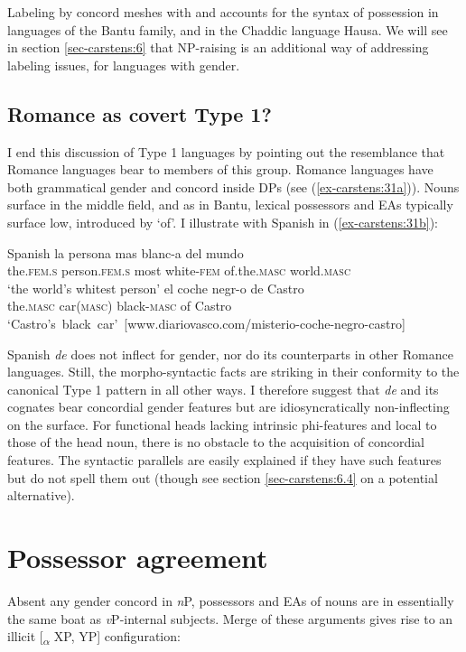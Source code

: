 \documentclass[output=paper
,modfonts
,nonflat]{langsci/langscibook}
\begin{document}
Labeling by concord meshes with and accounts for the syntax of possession in languages of the Bantu family, and in the Chaddic language Hausa. We will see in section \ref{sec-carstens:6} that NP-raising is an additional way of addressing labeling issues, for languages with gender. 

\subsection{Romance as covert Type 1?} \label{sec-carstens:3.3}

I end this discussion of Type 1 languages by pointing out the resemblance that Romance languages bear to members of this group. Romance languages have both grammatical gender and concord inside DPs (see (\ref{ex-carstens:31a})). Nouns surface in the middle field, and as in Bantu, lexical possessors and EAs typically surface low, introduced by ‘of’. I illustrate with Spanish in (\ref{ex-carstens:31b}):

\begin{exe}
	\ex Spanish \label{ex-carstens:31}
	\xlist
	\ex \label{ex-carstens:31a}
	\gll la           persona       mas   blanc-a      del mundo \\
	the.\textsc{fem}.\textsc{s}   person.\textsc{fem}.\textsc{s}   most white-\textsc{fem}     of.the.\textsc{masc} world.\textsc{masc}\\
	\glt `the world's whitest person'  	
	\ex \label{ex-carstens:31b}
	\gll el       coche       negr-o      de Castro \\
	the.\textsc{masc} car(\textsc{masc})  black-\textsc{masc}  of Castro\\
	\glt \mbox{`Castro's black car' [www.diariovasco.com/misterio-coche-negro-castro]}
	\endxlist
\end{exe}
Spanish \textit{de} does not inflect for gender, nor do its counterparts in other Romance languages. Still, the morpho-syntactic facts are striking in their conformity to the canonical Type 1 pattern in all other ways. I therefore suggest that \textit{de} and its cognates bear concordial gender features but are idiosyncratically non-inflecting on the surface. For functional heads lacking intrinsic phi-features and local to those of the head noun, there is no obstacle to the acquisition of concordial features. The syntactic parallels are easily explained if they have such features but do not spell them out (though see section \ref{sec-carstens:6.4} on a potential alternative).       

\section{Possessor agreement} \label{sec-carstens:4}
Absent any gender concord in \textit{n}P, possessors and EAs of nouns are in essentially the same boat as \textit{v}P-internal subjects. Merge of these arguments gives rise to an illicit [\textsubscript{${\alpha}$} XP, YP] configuration:
\end{document}
